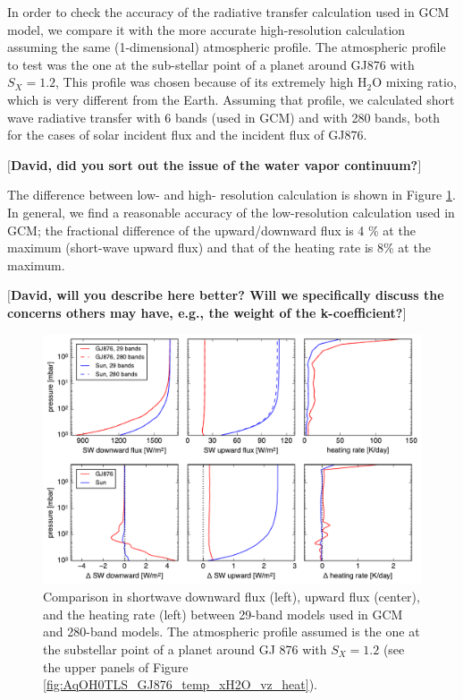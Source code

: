 \documentclass[11pt,numberedappendix,twocolappendix,]{emulateapj}
\def\water{H$_2$O }
\def\memo#1{\color{red}$[${\bf #1}$]$ \color{black}}
\begin{document}
In order to check the accuracy of the radiative transfer calculation used in GCM model, we compare it with the more accurate high-resolution calculation assuming the same (1-dimensional) atmospheric profile. 
The atmospheric profile to test was the one at the sub-stellar point of a planet around GJ876 with $S_X=1.2$, 
This profile was chosen because of its extremely high \water mixing ratio, which is very different from the Earth. 
Assuming that profile, we calculated short wave radiative transfer with 6 bands (used in GCM) and with 280 bands, both for the cases of solar incident flux and the incident flux of GJ876. 

\memo{David, did you sort out the issue of the water vapor continuum?}

The difference between low- and high- resolution calculation is shown in Figure \ref{fig:socrates}. 
In general, we find a reasonable accuracy of the low-resolution calculation used in GCM; the fractional difference of the upward/downward flux is 4 \% at the maximum (short-wave upward flux) and that of the heating rate is 8\% at the maximum. 

\memo{David, will you describe here better? Will we specifically discuss the concerns others may have, e.g., the weight of the k-coefficient?}

\begin{figure}[!htb]
    \begin{center}
    \includegraphics[width=0.8\hsize]{fig/rad_comparison_SW29-SW280_AqOH0TLS_GJ876S12P20L40Q.pdf}
    \end{center}
\caption{Comparison in shortwave downward flux (left), upward flux (center), and the heating rate (left) between 29-band models used in GCM and 280-band models. The atmospheric profile assumed is the one at the substellar point of a planet around GJ 876 with $S_X=1.2$ (see the upper panels of Figure \ref{fig:AqOH0TLS_GJ876_temp_xH2O_vz_heat}). }
\label{fig:socrates}
\end{figure}
\end{document}
